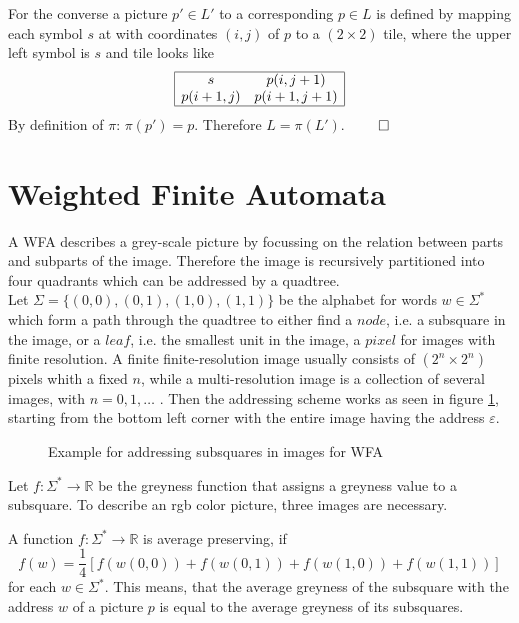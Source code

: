 \documentclass{article}
\begin{document}
For the converse a picture $p' \in L'$ to a corresponding $p \in L$ is defined by mapping each symbol $s$ at with coordinates $(i,j)$ of $p$ to a $(2\times 2)$ tile, where the upper left symbol is $s$ and tile looks like 
$$\begin{array}{|cc|}
\hline
s & p(i, j+1)\\
p(i+1,j) & p(i+1, j+1)\\
\hline
\end{array}
$$
By definition of $\pi$: $\pi(p')=p$. Therefore $L=\pi(L')$. $\qed$









\newpage
\section{Weighted Finite Automata}

A WFA describes a grey-scale picture by focussing on the relation between parts and subparts of the image. Therefore the image is recursively partitioned into four quadrants which can be addressed by a quadtree. \\
Let $\Sigma = \{ (0,0), (0,1), (1,0),(1,1)\}$ be the alphabet for words $w \in \Sigma^*$ which form a path through the quadtree to either find a $node$, i.e. a subsquare in the image, or a $leaf$, i.e. the smallest unit in the image, a $pixel$ for images with finite resolution. A finite finite-resolution image usually consists of $(2^n \times 2^n)$ pixels whith a fixed $n$, while a multi-resolution image is a collection of several images, with $n=0,1,\dots$ . Then the addressing scheme works as seen in figure \ref{fig:addr}, starting from the bottom left corner with the entire image having the address $\varepsilon$.
\begin{figure}[ht]
\centering
 
\caption{Example for addressing subsquares in images for WFA}
\label{fig:addr}
\end{figure}

Let $f: \Sigma^* \rightarrow \mathbb{R}$ be the greyness function that assigns a greyness value to a subsquare. To describe an rgb color picture, three images are necessary.

A function $f: \Sigma^* \rightarrow \mathbb{R}$ is average preserving, if 
$$f(w) = \frac{1}{4}[f(w(0,0)) + f(w(0,1)) + f(w(1,0)) + f(w(1,1))] $$
for each $w \in \Sigma^*$. This means, that the average greyness of the subsquare with the address $w$ of a picture $p$ is equal to the average greyness of its subsquares. 
\end{document}
